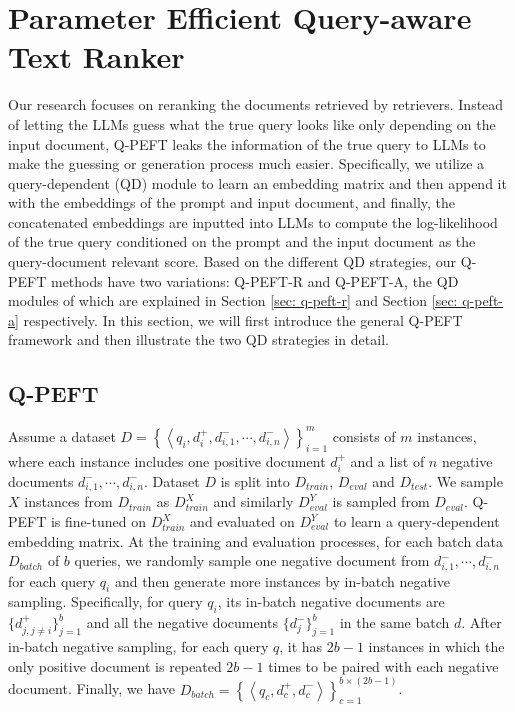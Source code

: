 \documentclass[sigconf,natbib=true,anonymous=false]{acmart}
\begin{document}
\section{Parameter Efficient Query-aware Text Ranker}
Our research focuses on reranking the documents retrieved by retrievers. Instead of letting the LLMs guess what the true query looks like only depending on the input document, Q-PEFT leaks the information of the true query to LLMs to make the guessing or generation process much easier. Specifically, we utilize a query-dependent (QD) module to learn an embedding matrix and then append it with the embeddings of the prompt and input document, and finally, the concatenated embeddings are inputted into LLMs to compute the log-likelihood of the true query conditioned on the prompt and the input document as the query-document relevant score. Based on the different QD strategies, our Q-PEFT methods have two variations: Q-PEFT-R and Q-PEFT-A, the QD modules of which are explained in Section \ref{sec: q-peft-r} and Section \ref{sec: q-peft-a} respectively. In this section, we will first introduce the general Q-PEFT framework and then illustrate the two QD strategies in detail.

\subsection{Q-PEFT}
Assume a dataset $D=\left\{\left\langle q_i, d_i^{+}, d_{i, 1}^{-}, \cdots, d_{i, n}^{-}\right\rangle\right\}_{i=1}^m$ consists of $m$ instances, where each instance includes one positive document $d_i^{+}$ and a list of $n$ negative documents $d_{i, 1}^{-}, \cdots, d_{i, n}^{-}$. Dataset $D$ is split into $D_{train}$, $D_{eval}$ and $D_{test}$. We sample $X$ instances from $D_{train}$ as $D_{train}^{X}$ and similarly $D_{eval}^{Y}$ is sampled from $D_{eval}$. Q-PEFT is fine-tuned on $D_{train}^{X}$ and evaluated on $D_{eval}^{Y}$ to learn a query-dependent embedding matrix. At the training and evaluation processes, for each batch data $D_{batch}$ of $b$ queries, we randomly sample one negative document from $d_{i, 1}^{-}, \cdots, d_{i, n}^{-}$ for each query $q_i$ and then generate more instances by in-batch negative sampling. Specifically, for query $q_{i}$, its in-batch negative documents are $\{d_{j, j\neq i}^{+}\}_{j=1}^{b}$ and all the negative documents $\{d_j^{-}\}_{j=1}^{b}$ in the same batch $d$. After in-batch negative sampling, for each query $q$, it has $2b-1$ instances in which the only positive document is repeated $2b-1$ times to be paired with each negative document. Finally, we have $D_{batch} = \left\{\left\langle q_c, d_c^{+}, d_{c}^{-}\right\rangle\right\}_{c=1}^{b\times(2b-1)}$.
\end{document}
